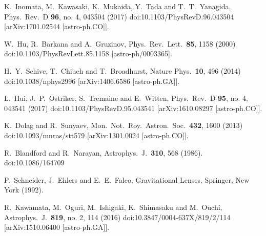 \documentclass[showpacs,twocolumn,preprintnumbers,amsmath,amssymb,superscriptaddress,nofootinbib]{revtex4}
\begin{document}
\begin{thebibliography}{0}
  K.~Inomata, M.~Kawasaki, K.~Mukaida, Y.~Tada and T.~T.~Yanagida,
  Phys.\ Rev.\ D {\bf 96}, no. 4, 043504 (2017)
  doi:10.1103/PhysRevD.96.043504
  [arXiv:1701.02544 [astro-ph.CO]].

  W.~Hu, R.~Barkana and A.~Gruzinov,
  Phys.\ Rev.\ Lett.\  {\bf 85}, 1158 (2000)
  doi:10.1103/PhysRevLett.85.1158
  [astro-ph/0003365].

  H.~Y.~Schive, T.~Chiueh and T.~Broadhurst,
  Nature Phys.\  {\bf 10}, 496 (2014)
  doi:10.1038/nphys2996
  [arXiv:1406.6586 [astro-ph.GA]].

  L.~Hui, J.~P.~Ostriker, S.~Tremaine and E.~Witten,
  Phys.\ Rev.\ D {\bf 95}, no. 4, 043541 (2017)
  doi:10.1103/PhysRevD.95.043541
  [arXiv:1610.08297 [astro-ph.CO]].

  K.~Dolag and R.~Sunyaev,
  Mon.\ Not.\ Roy.\ Astron.\ Soc.\  {\bf 432}, 1600 (2013)
  doi:10.1093/mnras/stt579
  [arXiv:1301.0024 [astro-ph.CO]].

  R.~Blandford and R.~Narayan,
  Astrophys.\ J.\  {\bf 310}, 568 (1986).
  doi:10.1086/164709

P.~Schneider, J.~Ehlers and E.~E.~Falco, Gravitational
Lenses, Springer, New York (1992).

  R.~Kawamata, M.~Oguri, M.~Ishigaki, K.~Shimasaku and M.~Ouchi,
  Astrophys.\ J.\  {\bf 819}, no. 2, 114 (2016)
  doi:10.3847/0004-637X/819/2/114
  [arXiv:1510.06400 [astro-ph.GA]].


\end{thebibliography}
\end{document}
